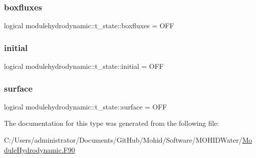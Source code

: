 \subsubsection{\texorpdfstring{boxfluxes}{boxfluxes}}
{\footnotesize\ttfamily logical modulehydrodynamic\+::t\+\_\+state\+::boxfluxes = O\+FF\hspace{0.3cm}{\ttfamily [private]}}

\mbox{\label{structmodulehydrodynamic_1_1t__state_a95d572e439f1a4b6fedd502ea97c881d}} 
\subsubsection{\texorpdfstring{initial}{initial}}
{\footnotesize\ttfamily logical modulehydrodynamic\+::t\+\_\+state\+::initial = O\+FF\hspace{0.3cm}{\ttfamily [private]}}

\mbox{\label{structmodulehydrodynamic_1_1t__state_a8131a4e982571cf7ccacc2f3e9f71b97}} 
\subsubsection{\texorpdfstring{surface}{surface}}
{\footnotesize\ttfamily logical modulehydrodynamic\+::t\+\_\+state\+::surface = O\+FF\hspace{0.3cm}{\ttfamily [private]}}



The documentation for this type was generated from the following file\+:\begin{DoxyCompactItemize}
\item 
C\+:/\+Users/administrator/\+Documents/\+Git\+Hub/\+Mohid/\+Software/\+M\+O\+H\+I\+D\+Water/\mbox{\hyperlink{_module_hydrodynamic_8_f90}{Module\+Hydrodynamic.\+F90}}\end{DoxyCompactItemize}
